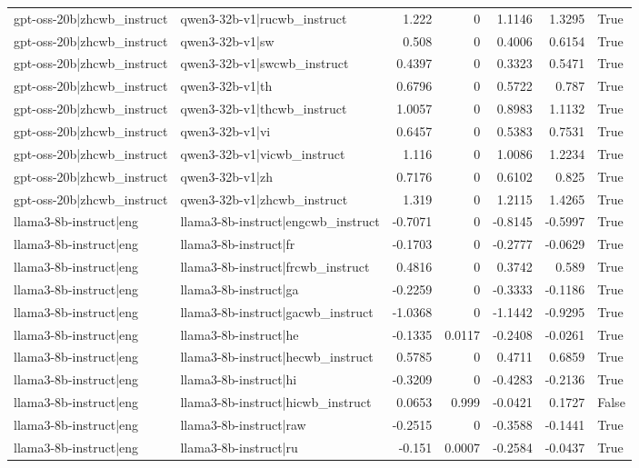 \begin{table}
\begin{tabular}{l l r r r r l}
gpt-oss-20b|zhcwb_instruct & qwen3-32b-v1|rucwb_instruct & 1.222 & 0 & 1.1146 & 1.3295 & True \\
gpt-oss-20b|zhcwb_instruct & qwen3-32b-v1|sw & 0.508 & 0 & 0.4006 & 0.6154 & True \\
gpt-oss-20b|zhcwb_instruct & qwen3-32b-v1|swcwb_instruct & 0.4397 & 0 & 0.3323 & 0.5471 & True \\
gpt-oss-20b|zhcwb_instruct & qwen3-32b-v1|th & 0.6796 & 0 & 0.5722 & 0.787 & True \\
gpt-oss-20b|zhcwb_instruct & qwen3-32b-v1|thcwb_instruct & 1.0057 & 0 & 0.8983 & 1.1132 & True \\
gpt-oss-20b|zhcwb_instruct & qwen3-32b-v1|vi & 0.6457 & 0 & 0.5383 & 0.7531 & True \\
gpt-oss-20b|zhcwb_instruct & qwen3-32b-v1|vicwb_instruct & 1.116 & 0 & 1.0086 & 1.2234 & True \\
gpt-oss-20b|zhcwb_instruct & qwen3-32b-v1|zh & 0.7176 & 0 & 0.6102 & 0.825 & True \\
gpt-oss-20b|zhcwb_instruct & qwen3-32b-v1|zhcwb_instruct & 1.319 & 0 & 1.2115 & 1.4265 & True \\
llama3-8b-instruct|eng & llama3-8b-instruct|engcwb_instruct & -0.7071 & 0 & -0.8145 & -0.5997 & True \\
llama3-8b-instruct|eng & llama3-8b-instruct|fr & -0.1703 & 0 & -0.2777 & -0.0629 & True \\
llama3-8b-instruct|eng & llama3-8b-instruct|frcwb_instruct & 0.4816 & 0 & 0.3742 & 0.589 & True \\
llama3-8b-instruct|eng & llama3-8b-instruct|ga & -0.2259 & 0 & -0.3333 & -0.1186 & True \\
llama3-8b-instruct|eng & llama3-8b-instruct|gacwb_instruct & -1.0368 & 0 & -1.1442 & -0.9295 & True \\
llama3-8b-instruct|eng & llama3-8b-instruct|he & -0.1335 & 0.0117 & -0.2408 & -0.0261 & True \\
llama3-8b-instruct|eng & llama3-8b-instruct|hecwb_instruct & 0.5785 & 0 & 0.4711 & 0.6859 & True \\
llama3-8b-instruct|eng & llama3-8b-instruct|hi & -0.3209 & 0 & -0.4283 & -0.2136 & True \\
llama3-8b-instruct|eng & llama3-8b-instruct|hicwb_instruct & 0.0653 & 0.999 & -0.0421 & 0.1727 & False \\
llama3-8b-instruct|eng & llama3-8b-instruct|raw & -0.2515 & 0 & -0.3588 & -0.1441 & True \\
llama3-8b-instruct|eng & llama3-8b-instruct|ru & -0.151 & 0.0007 & -0.2584 & -0.0437 & True \\

\end{tabular}
\end{table}
